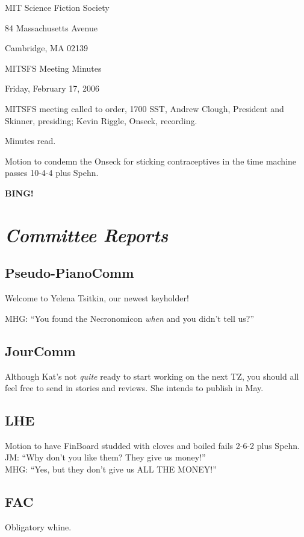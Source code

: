 \documentclass[10pt]{article}
\newcommand{\bing}{{\bf BING!} }
\newcommand{\goto}[1]{\bing \vskip 12pt \section*{{\em{#1}}}}
\newcommand{\ps}{ plus Spehn\xspace}
\begin{document}
\begin{center}

MIT Science Fiction Society

84 Massachusetts Avenue

Cambridge, MA 02139

\vspace{12pt}

MITSFS Meeting Minutes

Friday, February 17, 2006

\end{center}

\vspace{18pt}

\setlength{\parskip}{6pt}

\noindent
MITSFS meeting called to order, 1700 SST,
Andrew Clough, President and Skinner, presiding; Kevin Riggle, Onseck, recording.

Minutes read.

Motion to condemn the Onseck for sticking contraceptives in the time machine passes 10-4-4\ps.

\goto{Committee Reports}

\subsection*{Pseudo-PianoComm}
Welcome to Yelena Tsitkin, our newest keyholder!

MHG: ``You found the Necronomicon \emph{when} and  you didn't tell us?''

\subsection*{JourComm}
Although Kat's not \emph{quite} ready to start working on the next TZ, you should all feel free
to send in stories and reviews.  She intends to publish in May.

\subsection*{LHE}
Motion to have FinBoard studded with cloves and boiled fails 2-6-2\ps.\\
JM: ``Why don't you like them?  They give us money!''\\
MHG: ``Yes, but they don't give us ALL THE MONEY!''

\subsection*{FAC}
Obligatory whine.
\end{document}

